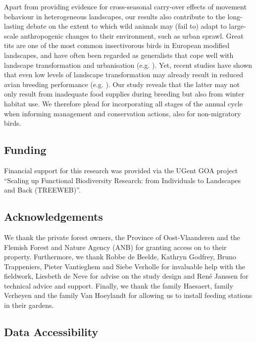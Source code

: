 \documentclass[10pt, twoside]{book} %
\begin{document}
Apart from providing evidence for cross-seasonal carry-over effects of movement behaviour in heterogeneous landscapes, our results also contribute to the long-lasting debate on the extent to which wild animals may (fail to) adapt to large-scale anthropogenic changes to their environment, such as urban sprawl. Great tits are one of the most common insectivorous birds in European modified landscapes, and have often been regarded as generalists that cope well with landscape transformation and urbanisation (e.g. \citealt{Kark2007}). Yet, recent studies have shown that even low levels of landscape transformation may already result in reduced avian breeding performance (e.g. \citealt{Hinsley2009, Seress2018, DeSatge2019}). Our study reveals that the latter may not only result from inadequate food supplies during breeding \citep{Derryberry2020, Seress2020} but also from winter habitat use. We therefore plead for incorporating all stages of the annual cycle when informing management and conservation actions, also for non-migratory birds. 

	
	\subsection*{Funding}

Financial support for this research was provided via the UGent GOA project ``Scaling up Functional Biodiversity Research: from Individuals to Landscapes and Back (TREEWEB)''.
	
	\subsection*{Acknowledgements}
	
We thank the private forest owners, the Province of Oost-Vlaanderen and the Flemish Forest and Nature Agency (ANB) for granting access on to their property. Furthermore, we thank Robbe de Beelde, Kathryn Godfrey, Bruno Trappeniers, Pieter Vantieghem and Siebe Verholle for invaluable help with the fieldwork, Liesbeth de Neve for advise on the study design and Ren\'{e} Janssen for technical advice and support. Finally, we thank the family Haesaert, family Verheyen and the family Van Hoeylandt for allowing us to install feeding stations in their gardens.
	
	\subsection*{Data Accessibility}
	
\end{document}
